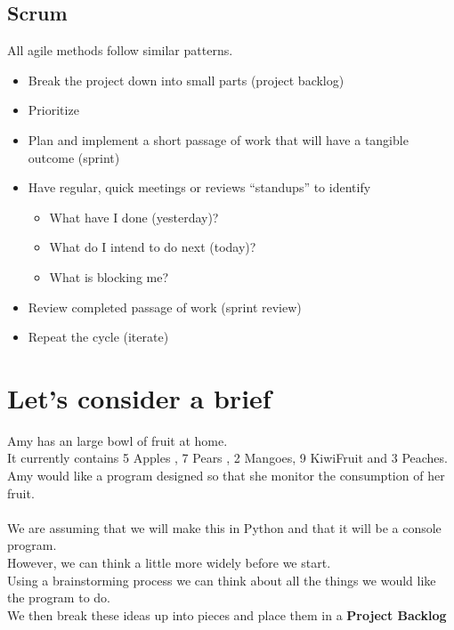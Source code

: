 \documentclass[a4paper,12pt]{article}
\begin{document}
\subsection{Scrum}
All agile methods follow similar patterns.
\begin{itemize}
	\item Break the project down into small parts (project backlog)
	\item Prioritize
	\item Plan and implement a short passage of work that will have a tangible outcome (sprint)
	\item Have regular, quick meetings or reviews ``standups'' to identify 
	\begin{itemize}
		\item What have I done (yesterday)?
		\item What do I intend to do next (today)?
		\item What is blocking me?
	\end{itemize}
	\item Review completed passage of work (sprint review)
	\item Repeat the cycle (iterate)
\end{itemize}

\newpage
\section{Let's consider a brief}
	
Amy has an  large bowl of fruit at home.\\
It currently contains 5 Apples , 7 Pears , 2 Mangoes, 9 KiwiFruit and 3 Peaches.\\
Amy would like a program designed so that she monitor the consumption of her fruit.\\\\

We are assuming that we will make this in Python and that it will be a console program.\\
However, we can think a little more widely before we start.\\
Using a brainstorming process we can think about all the things we would like the program to do.\\
We then break these ideas up into pieces and place them in a \textbf{Project Backlog}
\end{document}
